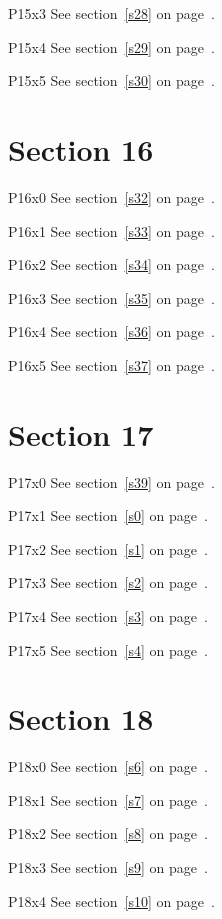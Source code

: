 P15x3 \w\w\w\w\w\w See section~\ref{s28} on page~\pageref{s8}.

P15x4 \w\w\w\w\w\w See section~\ref{s29} on page~\pageref{s9}.

P15x5 \w\w\w\w\w\w See section~\ref{s30} on page~\pageref{s10}.

\section{Section 16}\label{s16}
P16x0 \w\w\w\w\w\w See section~\ref{s32} on page~\pageref{s8}.

P16x1 \w\w\w\w\w\w See section~\ref{s33} on page~\pageref{s9}.

P16x2 \w\w\w\w\w\w See section~\ref{s34} on page~\pageref{s10}.

P16x3 \w\w\w\w\w\w See section~\ref{s35} on page~\pageref{s11}.

P16x4 \w\w\w\w\w\w See section~\ref{s36} on page~\pageref{s12}.

P16x5 \w\w\w\w\w\w See section~\ref{s37} on page~\pageref{s13}.

\section{Section 17}\label{s17}
P17x0 \w\w\w\w\w\w See section~\ref{s39} on page~\pageref{s11}.

P17x1 \w\w\w\w\w\w See section~\ref{s0} on page~\pageref{s12}.

P17x2 \w\w\w\w\w\w See section~\ref{s1} on page~\pageref{s13}.

P17x3 \w\w\w\w\w\w See section~\ref{s2} on page~\pageref{s14}.

P17x4 \w\w\w\w\w\w See section~\ref{s3} on page~\pageref{s15}.

P17x5 \w\w\w\w\w\w See section~\ref{s4} on page~\pageref{s16}.

\section{Section 18}\label{s18}
P18x0 \w\w\w\w\w\w See section~\ref{s6} on page~\pageref{s14}.

P18x1 \w\w\w\w\w\w See section~\ref{s7} on page~\pageref{s15}.

P18x2 \w\w\w\w\w\w See section~\ref{s8} on page~\pageref{s16}.

P18x3 \w\w\w\w\w\w See section~\ref{s9} on page~\pageref{s17}.

P18x4 \w\w\w\w\w\w See section~\ref{s10} on page~\pageref{s18}.

